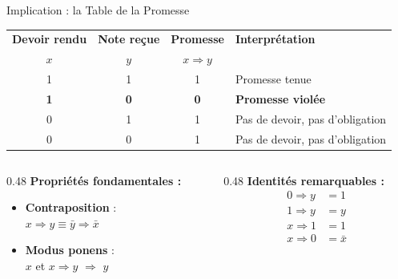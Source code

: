 \begin{frame}{Implication : la Table de la Promesse}

    \centering
    \renewcommand{\arraystretch}{1.3}
    \begin{tabular}{|c|c|c|l|}
        \hline
        \textbf{Devoir rendu} & \textbf{Note reçue} & \textbf{Promesse} & \textbf{Interprétation} \\
        \(x\) & \(y\) & \(x \Rightarrow y\) & \\
        \hline
        1 & 1 & 1 & Promesse tenue \\
        \textbf{1} & \textbf{0} & \textbf{0} & \textbf{Promesse violée} \\
        0 & 1 & 1 & Pas de devoir, pas d'obligation \\
        0 & 0 & 1 & Pas de devoir, pas d'obligation \\
        \hline
    \end{tabular}

    \vspace{0.5cm}

    \begin{columns}[T]
        \begin{column}{0.48\textwidth}
            \textbf{Propriétés fondamentales :}
            \begin{itemize}
                \item \textbf{Contraposition} :\\
                      \(x \Rightarrow y \equiv \bar{y} \Rightarrow \bar{x}\)
                \item \textbf{Modus ponens} :\\
                      \(x\) et \(x \Rightarrow y\) \(\Longrightarrow\) \(y\)
            \end{itemize}
        \end{column}
        \begin{column}{0.48\textwidth}
            \textbf{Identités remarquables :}
            \begin{align*}
                0 \Rightarrow y &= 1 \\
                1 \Rightarrow y &= y \\
                x \Rightarrow 1 &= 1 \\
                x \Rightarrow 0 &= \bar{x}
            \end{align*}
        \end{column}
    \end{columns}

\end{frame}

